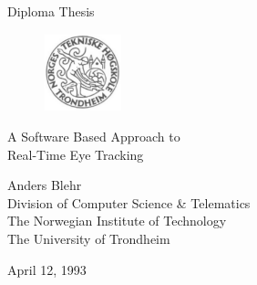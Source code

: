 
\begin{titlepage}
\begin{center}

\vspace*{1in}

{\Large Diploma Thesis}

\vspace*{0.8in}

\begin{figure}[h]
  \centering
  \includegraphics[width=0.2\textwidth]{figurer/nth.pdf}
\end{figure}


\vspace*{0.8in}

{\Huge A Software Based Approach to\\}
\vspace*{0.05in}
{\Huge Real-Time Eye Tracking}

\vspace*{0.8in}

{\large Anders Blehr\\
Division of Computer Science \& Telematics\\
The Norwegian Institute of Technology\\
The University of Trondheim\\
}

\vspace*{0.8in}
April 12, 1993

\end{center}
\end{titlepage}
